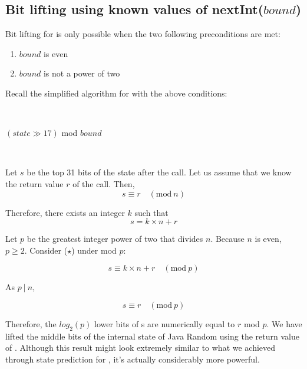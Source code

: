 \documentclass{article}
\begin{document}
\subsection{ Bit lifting using known values of nextInt($bound$) }

Bit lifting for  is only possible when the two following preconditions are met:
\begin{enumerate}
    \item $bound$ is even
    \item $bound$ is not a power of two
\end{enumerate}

\noindent Recall the simplified algorithm for  with the above conditions:

\
\begin{algorithmic}
    \State \Return $(state \gg 17)$ mod $bound$
\EndFunction
\end{algorithmic}
\ \

Let $s$ be the top 31 bits of the state after the  call. Let us assume that we know the return value $r$ of the  call. Then,
\begin{equation}
    s \equiv r \quad (\text{mod} \ n)
\end{equation}

\noindent Therefore, there exists an integer $k$ such that
\begin{equation}\tag{$\star$}
     s = k \times n + r
\end{equation}

\noindent Let $p$ be the greatest integer power of two that divides $n$. Because $n$ is even, $p \ge 2$. Consider ($\star$) under mod $p$:

\begin{equation}
     s \equiv k \times n + r \quad (\text{mod} \ p)
\end{equation}

\noindent As $p \ | \ n$,

\begin{equation}\label{lifting.core}\tag{$\star\star$}
     s \equiv r \quad (\text{mod} \ p)
\end{equation}

Therefore, the $log_2(p)$ lower bits of s are numerically equal to $r$ mod $p$. We have lifted the middle bits of the internal state of Java Random using the return value of . Although this result might look extremely similar to what we achieved through state prediction for , it’s actually considerably more powerful.
\end{document}
